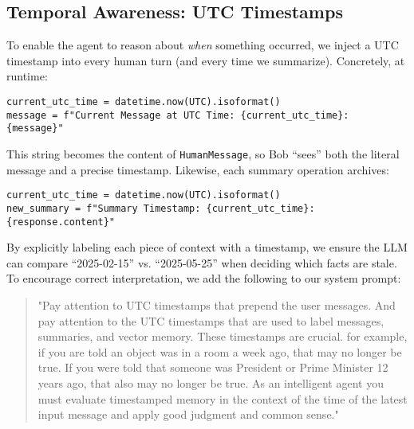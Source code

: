 \documentclass[conference]{IEEEtran}
\begin{document}
\subsection{Temporal Awareness: UTC Timestamps}
To enable the agent to reason about \emph{when} something occurred, we inject a UTC timestamp into every human turn (and every time we summarize). Concretely, at runtime:
\begin{verbatim}
current_utc_time = datetime.now(UTC).isoformat()
message = f"Current Message at UTC Time: {current_utc_time}: {message}"
\end{verbatim}
This string becomes the content of \texttt{HumanMessage}, so Bob “sees” both the 
literal message and a precise timestamp. Likewise, each summary operation archives:
\begin{verbatim}
current_utc_time = datetime.now(UTC).isoformat()
new_summary = f"Summary Timestamp: {current_utc_time}: {response.content}"
\end{verbatim}
By explicitly labeling each piece of context with a timestamp, 
we ensure the LLM can compare “2025-02-15” vs. “2025-05-25” 
when deciding which facts are stale. To encourage correct interpretation, 
we add the following to our system prompt:
\begin{quote}
  "Pay attention to UTC timestamps that prepend the user messages.  And pay attention to the UTC timestamps that are used to label messages, summaries, and vector memory.  These timestamps are crucial.  for example, if you are told an object was in a room a week ago, that may no longer be true.  If you were told that someone was President or Prime Minister 12 years ago, that also may no longer be true.  As an intelligent agent you must evaluate timestamped memory in the context of the time of the latest input message and apply good judgment and common sense."
\end{quote}
\end{document}
